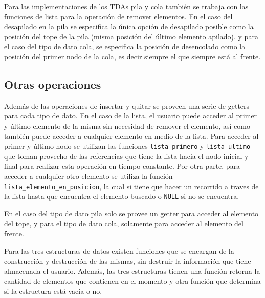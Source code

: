 \documentclass[titlepage,a4paper]{article}
\begin{document}
Para las implementaciones de los TDAs pila y cola también se trabaja con las funciones de lista para la operación de remover elementos. En el caso del desapilado en la pila se especifica la única opción de desapilado posible como la posición del tope de la pila (misma posición del último elemento apilado), y para el caso del tipo de dato cola, se especifica la posición de desencolado como la posición del primer nodo de la cola, es decir siempre el que siempre está al frente.

												 \subsection{Otras operaciones}

Además de las operaciones de insertar y quitar se proveen una serie de getters para cada tipo de dato. En el caso de la lista, el usuario puede acceder al primer y último elemento de la misma sin necesidad de remover el elemento, así como también puede acceder a cualquier elemento en medio de la lista. Para acceder al primer y último nodo se utilizan las funciones \lstinline{lista_primero} y \lstinline{lista_ultimo} que toman provecho de las referencias que tiene la lista hacia el nodo inicial y final para realizar esta operación en tiempo constante. Por otra parte, para acceder a cualquier otro elemento se utiliza la función \lstinline{lista_elemento_en_posicion}, la cual si tiene que hacer un recorrido a traves de la lista hasta que encuentra el elemento buscado o \lstinline{NULL} si no se encuentra.

En el caso del tipo de dato pila solo se provee un getter para acceder al elemento del tope, y para el tipo de dato cola, solamente para acceder al elemento del frente.

Para las tres estructuras de datos existen funciones que se encargan de la construcción y destrucción de las mismas, sin destruir la información que tiene almacenada el usuario. Además, las tres estructuras tienen una función retorna la cantidad de elementos que contienen en el momento y otra función que determina si la estructura está vacía o no.
\end{document}
